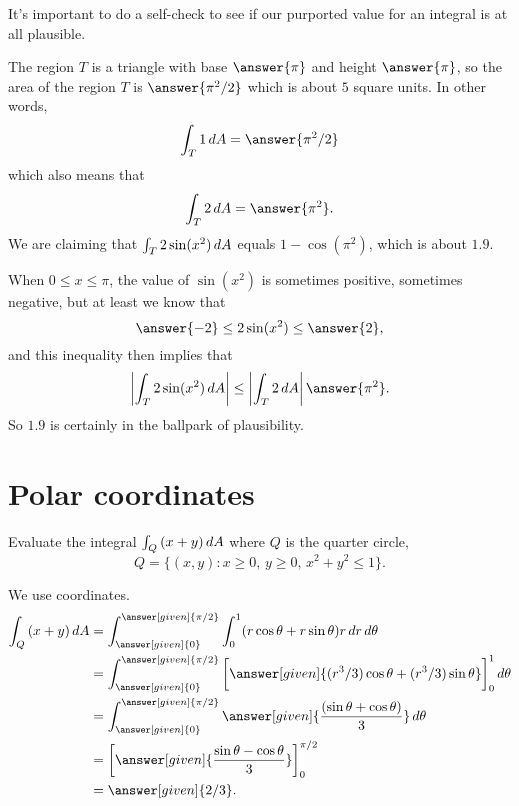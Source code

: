 \documentclass{ximera}
\begin{document}
\begin{question}
  It's important to do a self-check to see if our purported value for
  an integral is at all plausible.

  The region $T$ is a triangle with base $\answer{\pi}$ and height
  $\answer{\pi}$, so the area of the region $T$ is $\answer{\pi^2/2}$
  which is about $5$ square units.  In other words,
  \[
  \int_T 1 \d A = \answer{\pi^2/2}
  \]
  which also means that
  \[
  \int_T 2 \d A = \answer{\pi^2}.
  \]
  We are claiming that $\int_T 2 \sin (x^2) \mathop{}\!d A$ equals
  $1 - \cos (\pi^2)$, which is about $1.9$.

  When $0 \leq x \leq \pi$, the value of $\sin (x^2)$ is sometimes
  positive, sometimes negative, but at least we know that
  \[
  \answer{-2} \leq 2 \sin (x^2) \leq \answer{2},
  \]
  and this inequality then implies that
  \[
  \left| \int_T 2 \sin (x^2) \d A \right| \leq \left| \int_T 2 \d A \right| \answer{\pi^2}.
  \]
  So $1.9$ is certainly in the ballpark of plausibility.
\end{question}

\section{Polar coordinates}

\begin{example}
  Evaluate the integral $\int_Q \left(x + y\right) \mathop{}\!d A$ where $Q$ is the quarter circle,
  \[
  Q = \{ (x,y)  : \text{$x \geq 0$, $y \geq 0$, $x^2 + y^2 \leq 1$} \}.
  \]
  
  \begin{explanation}
    We use  coordinates.
    \begin{align*}
      \int_Q \left(x + y\right) \d A
      &= \int_{\answer[given]{0}}^{\answer[given]{\pi/2}} \int_{0}^{1} (r \cos \theta + r \sin \theta) r \d r \d \theta \\
      &= \int_{\answer[given]{0}}^{\answer[given]{\pi/2}} \eval{\answer[given]{
          (r^3/3) \cos \theta + (r^3/3) \sin \theta
      }}_0^1\d \theta \\  
      &= \int_{\answer[given]{0}}^{\answer[given]{\pi/2}}\answer[given]{\frac{(\sin \theta + \cos \theta)}{3}}\d\theta\\
      &= \eval{\answer[given]{\frac{\sin \theta - \cos \theta}{3}}}_{0}^{\pi/2} \\
      &= \answer[given]{2/3}.
    \end{align*}
  \end{explanation}
\end{example}
\end{document}
